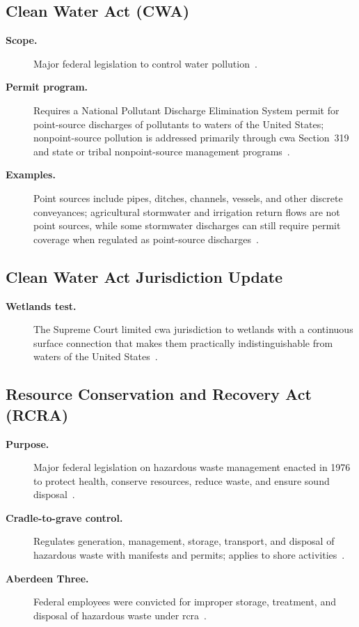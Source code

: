 \documentclass[../main.tex]{subfiles}
\begin{document}
\subsection{Clean Water Act (CWA)}
\begin{description}
  \item[\textbf{Scope.}] Major federal legislation to control water pollution~\autocite{edo-3-3-7-environmental-requirements-2025}.
  \item[\textbf{Permit program.}] Requires a National Pollutant Discharge Elimination System permit for point-source discharges of pollutants to waters of the United States; nonpoint-source pollution is addressed primarily through \ac{cwa} Section~319 and state or tribal nonpoint-source management programs~\autocite{EPA-NPDES-Permit-Basics-2026,EPA-Nonpoint-Source-Program-2026,edo-3-3-7-environmental-requirements-2025}.
  \item[\textbf{Examples.}] Point sources include pipes, ditches, channels, vessels, and other discrete conveyances; agricultural stormwater and irrigation return flows are not point sources, while some stormwater discharges can still require permit coverage when regulated as point-source discharges~\autocite{EPA-NPDES-Permit-Basics-2026,edo-3-3-7-environmental-requirements-2025}.
\end{description}

\subsection{Clean Water Act Jurisdiction Update}
\begin{description}
  \item[\textbf{Wetlands test.}] The Supreme Court limited \ac{cwa} jurisdiction to wetlands with a continuous surface connection that makes them practically indistinguishable from waters of the United States~\autocite{edo-3-3-7-environmental-requirements-2025}.
\end{description}

\subsection{Resource Conservation and Recovery Act (RCRA)}
\begin{description}
  \item[\textbf{Purpose.}] Major federal legislation on hazardous waste management enacted in 1976 to protect health, conserve resources, reduce waste, and ensure sound disposal~\autocite{edo-3-3-7-environmental-requirements-2025}.
  \item[\textbf{Cradle-to-grave control.}] Regulates generation, management, storage, transport, and disposal of hazardous waste with manifests and permits; applies to shore activities~\autocite{edo-3-3-7-environmental-requirements-2025}.
  \item[\textbf{Aberdeen Three.}] Federal employees were convicted for improper storage, treatment, and disposal of hazardous waste under \ac{rcra}~\autocite{edo-3-3-7-environmental-requirements-2025}.
\end{description}
\end{document}
